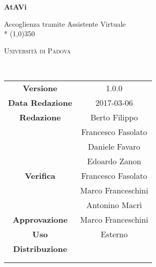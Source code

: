 \documentclass[a4paper,12pt]{article}
\author{}
\date{2017-02-10}
\begin{document}
	\begin{titlepage}
		\centering
		{\huge\bfseries AtAVi\par}
		Accoglienza tramite Assistente Virtuale \\*
		\line(1,0){350} \\
		{\scshape\LARGE Università di Padova \par}
		\vspace{1cm}
		{\scshape\Large {}\ \par}
		\logo
		\newpage
		\begin{tabular}{c|c}
			{\hfill \textbf{Versione}} 			& 1.0.0			\\ 
			{\hfill\textbf{Data Redazione}} 	& 2017-03-06 		\\ 
			{\hfill\textbf{Redazione}} 			& Berto Filippo \\ & Francesco Fasolato \\ & Daniele Favaro \\ & Edoardo Zanon \\ 
			{\hfill\textbf{Verifica}} 			& Francesco Fasolato \\ & Marco Franceschini \\ & Antonino Macrì \\  
			{\hfill\textbf{Approvazione}} 		& Marco Franceschini				\\
			{\hfill\textbf{Uso}} 				& Esterno 			\\
			{\hfill\textbf{Distribuzione}} 		& \vardanega \\ & \cardin \\ & \prop \\
		\end{tabular}
	\end{titlepage}
	
	\pagestyle{myfront}
	\newpage	
			

	\newpage
		\tableofcontents 	%
	\newpage
		\listoftables 		%
	\newpage	
		\listoffigures		%
	
	\label{LastFrontPage}
		\newpage
		\pagestyle{mymain}
			
		\newpage
			
		\newpage
			
		\newpage
			
		\newpage
			

	\label{LastPage}
\end{document}
